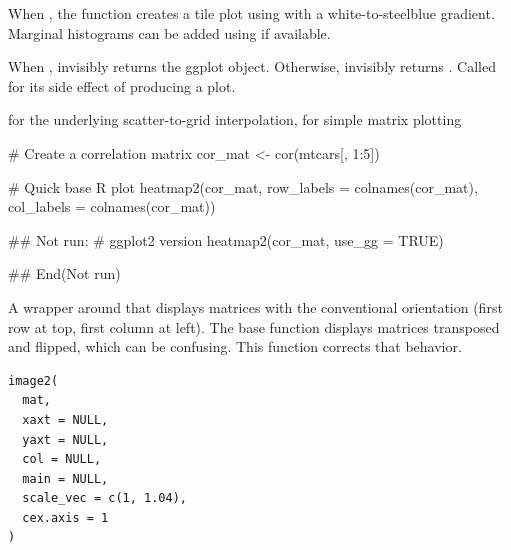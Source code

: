 \documentclass[a4paper]{book}
\begin{document}
%
\begin{Details}
When , the function creates a tile plot using
 with a white-to-steelblue gradient. Marginal
histograms can be added using  if available.
\end{Details}
%
\begin{Value}
When , invisibly returns the ggplot object.
Otherwise, invisibly returns . Called for its side effect of
producing a plot.
\end{Value}
%
\begin{SeeAlso}
 for the underlying scatter-to-grid
interpolation,  for simple matrix plotting
\end{SeeAlso}
%
\begin{Examples}
\begin{ExampleCode}
# Create a correlation matrix
cor_mat <- cor(mtcars[, 1:5])

# Quick base R plot
heatmap2(cor_mat, row_labels = colnames(cor_mat),
         col_labels = colnames(cor_mat))

## Not run: 
# ggplot2 version
heatmap2(cor_mat, use_gg = TRUE)

## End(Not run)

\end{ExampleCode}
\end{Examples}
%
\begin{Description}
A wrapper around  that displays matrices with
the conventional orientation (first row at top, first column at left). The
base  function displays matrices transposed and flipped, which
can be confusing. This function corrects that behavior.
\end{Description}
%
\begin{Usage}
\begin{verbatim}
image2(
  mat,
  xaxt = NULL,
  yaxt = NULL,
  col = NULL,
  main = NULL,
  scale_vec = c(1, 1.04),
  cex.axis = 1
)
\end{verbatim}
\end{Usage}
%
\end{document}
